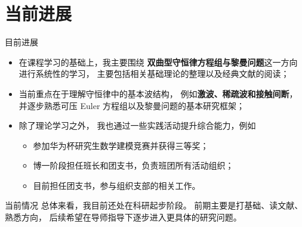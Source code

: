 \documentclass{beamer}
\begin{document}
\section{当前进展}



\begin{frame}{目前进展}
\small

\begin{itemize}

\item 在课程学习的基础上，我主要围绕
\textbf{双曲型守恒律方程组与黎曼问题}这一方向进行系统性的学习，
主要包括相关基础理论的整理以及经典文献的阅读；

\item 当前重点在于理解守恒律中的基本波结构，
例如\textbf{激波、稀疏波和接触间断}，
并逐步熟悉可压 Euler 方程组以及黎曼问题的基本研究框架；

\item 除了理论学习之外，
我也通过一些实践活动提升综合能力，例如
\begin{itemize}
\item 参加华为杯研究生数学建模竞赛并获得三等奖；
\item 博一阶段担任班长和团支书，负责班团所有活动组织；
\item 目前担任团支书，参与组织支部的相关工作。
\end{itemize}

\end{itemize}

\begin{block}{当前情况}
总体来看，我目前还处在科研起步阶段。
前期主要是打基础、读文献、熟悉方向，
后续希望在导师指导下逐步进入更具体的研究问题。
\end{block}

\end{frame}
\end{document}
